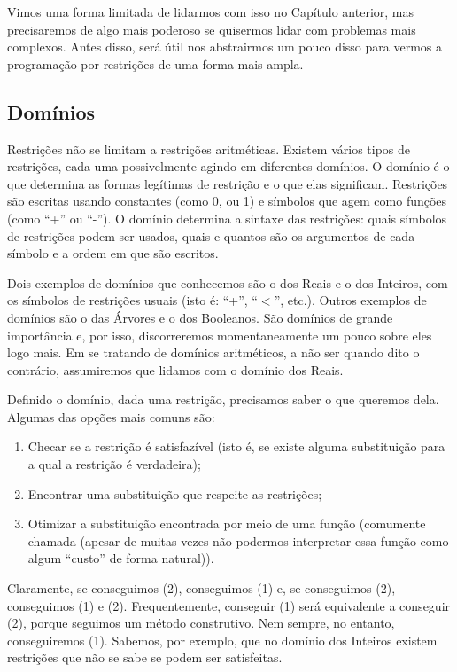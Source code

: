 Vimos uma forma limitada de lidarmos com isso no Capítulo anterior, %
mas precisaremos de algo mais poderoso se quisermos lidar com problemas mais complexos. Antes disso, será útil nos abstrairmos um pouco disso para vermos a programação por restrições de uma forma mais ampla.

\subsection{Domínios}

Restrições não se limitam a restrições aritméticas. Existem vários tipos de restrições, cada uma possivelmente agindo em diferentes domínios.
O domínio é o que determina as formas legítimas de restrição e o que elas significam. Restrições são escritas usando constantes (como 0, ou 1) e símbolos que agem como funções (como ``+'' ou ``-''). O domínio determina a sintaxe das restrições: quais símbolos de restrições podem ser usados, quais e quantos são os argumentos de cada símbolo e a ordem em que são escritos.

Dois exemplos de domínios que conhecemos são o dos Reais e o dos Inteiros, com os símbolos de restrições usuais (isto é: ``+'', ``$<$'', etc.). Outros exemplos de domínios são o das Árvores e o dos Booleanos. São domínios de grande importância e, por isso, discorreremos momentaneamente um pouco sobre eles logo mais. Em se tratando de domínios aritméticos, a não ser quando dito o contrário, assumiremos que lidamos com o domínio dos Reais.

Definido o domínio, dada uma restrição, precisamos saber o que queremos dela. Algumas das opções mais comuns são:
  \begin{enumerate}
    \item Checar se a restrição é satisfazível (isto é, se existe alguma substituição para a qual a restrição é verdadeira);
    \item Encontrar uma substituição que respeite as restrições;
    \item Otimizar a substituição encontrada por meio de uma função (comumente chamada  (apesar de muitas vezes não podermos interpretar essa função como algum ``custo'' de forma natural)).
  \end{enumerate}

  Claramente, se conseguimos (2), conseguimos (1) e, se conseguimos (2), conseguimos (1) e (2). Frequentemente, conseguir (1) será equivalente a conseguir (2), porque seguimos um método construtivo. Nem sempre, no entanto, conseguiremos (1). Sabemos, por exemplo, que no domínio dos Inteiros existem restrições que não se sabe se podem ser satisfeitas.

